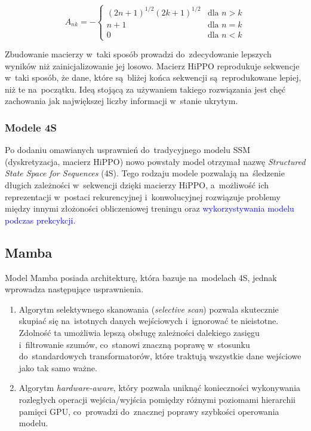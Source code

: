 \documentclass[data-science]{agh-wi} %
\begin{document}
\begin{equation}
    A_{nk} = -
    \begin{cases}
        (2n + 1)^{1/2} (2k + 1)^{1/2} & \text{dla } n > k \\
        n + 1                         & \text{dla } n = k \\
        0                             & \text{dla } n < k
    \end{cases}
    \label{equ:hippo_matrix}
\end{equation}

Zbudowanie macierzy w~taki sposób prowadzi do~zdecydowanie lepszych wyników niż zainicjalizowanie jej losowo. Macierz HiPPO reprodukuje sekwencje w~taki sposób, że dane, które są~bliżej końca sekwencji są~reprodukowane lepiej, niż te na~początku. Ideą stojącą za używaniem takiego rozwiązania jest chęć zachowania jak największej liczby informacji w~stanie ukrytym.

\subsubsection*{Modele 4S}
Po dodaniu omawianych usprawnień do~tradycyjnego modelu SSM (dyskretyzacja, macierz HiPPO) nowo powstały model otrzymał nazwę \textit{Structured State Space for Sequences} (4S). Tego rodzaju modele pozwalają na~śledzenie długich zależności w~sekwencji dzięki macierzy HiPPO, a~możliwość ich reprezentacji w~postaci rekurencyjnej i~konwolucyjnej rozwiązuje problemy między innymi złożoności obliczeniowej treningu oraz \textcolor{blue}{wykorzystywania modelu podczas prekcykcji.}

\subsection{Mamba}
Model Mamba posiada architekturę, która bazuje na~modelach 4S, jednak wprowadza następujące usprawnienia.
\begin{enumerate}
    \item Algorytm selektywnego skanowania (\textit{selective scan}) pozwala skutecznie skupiać się na~istotnych danych wejściowych i~ignorować te nieistotne. Zdolność ta umożliwia lepszą obsługę zależności dalekiego zasięgu i~filtrowanie szumów, co~stanowi znaczną poprawę w~stosunku do~standardowych transformatorów, które traktują wszystkie dane wejściowe jako tak samo ważne.
    \item Algorytm \textit{hardware-aware}, który pozwala uniknąć konieczności wykonywania rozległych operacji wejścia/wyjścia pomiędzy różnymi poziomami hierarchii pamięci GPU, co~prowadzi do~znacznej poprawy szybkości operowania modelu.
\end{enumerate}
\end{document}
